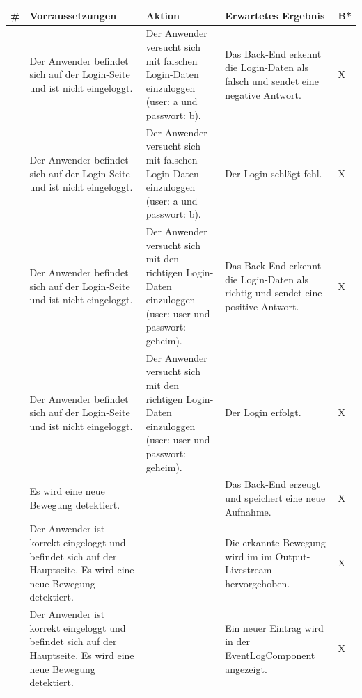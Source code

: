 \begin{longtable}{| p{} | p{} | p{} | p{} | p{} |}
	\hline
	
	\textbf{\#} & \textbf{Vorraussetzungen} & \textbf{Aktion} & \textbf{Erwartetes Ergebnis} & \textbf{B*} \\ \hline
	
	\stepcounter{SysTestNumber}\arabic{SysTestNumber} & Der Anwender befindet sich auf der Login-Seite und ist nicht eingeloggt. & Der Anwender versucht sich mit falschen Login-Daten einzuloggen (user: a und passwort: b). & Das Back-End erkennt die Login-Daten als falsch und sendet eine negative Antwort. & X \\ \hline
	
	\stepcounter{SysTestNumber}\arabic{SysTestNumber} & Der Anwender befindet sich auf der Login-Seite und ist nicht eingeloggt. & Der Anwender versucht sich mit falschen Login-Daten einzuloggen (user: a und passwort: b). & Der Login schlägt fehl. & X \\ \hline
	
	\stepcounter{SysTestNumber}\arabic{SysTestNumber} & Der Anwender befindet sich auf der Login-Seite und ist nicht eingeloggt. & Der Anwender versucht sich mit den richtigen Login-Daten einzuloggen (user: user und passwort: geheim). & Das Back-End erkennt die Login-Daten als richtig und sendet eine positive Antwort. & X \\ \hline
	
	\stepcounter{SysTestNumber}\arabic{SysTestNumber} & Der Anwender befindet sich auf der Login-Seite und ist nicht eingeloggt. & Der Anwender versucht sich mit den richtigen Login-Daten einzuloggen (user: user und passwort: geheim). & Der Login erfolgt. & X \\ \hline
	
	\stepcounter{SysTestNumber}\arabic{SysTestNumber} & Es wird eine neue Bewegung detektiert. & & Das Back-End erzeugt und speichert eine neue Aufnahme. & X \\ \hline
	
	\stepcounter{SysTestNumber}\arabic{SysTestNumber} & Der Anwender ist korrekt eingeloggt und befindet sich auf der Hauptseite. Es wird eine neue Bewegung detektiert. & & Die erkannte Bewegung wird im im Output-Livestream hervorgehoben. & X \\ \hline
	
	\stepcounter{SysTestNumber}\arabic{SysTestNumber} & Der Anwender ist korrekt eingeloggt und befindet sich auf der Hauptseite. Es wird eine neue Bewegung detektiert. & & Ein neuer Eintrag wird in der EventLogComponent angezeigt. & X \\ \hline
	

\end{longtable}
